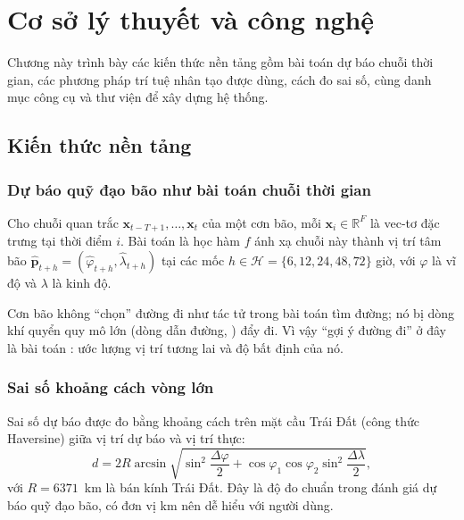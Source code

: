 \chapter{Cơ sở lý thuyết và công nghệ}
\label{ch:coso}

\begin{muctieu}
Chương này trình bày các kiến thức nền tảng gồm bài toán dự báo chuỗi thời
gian, các phương pháp trí tuệ nhân tạo được dùng, cách đo sai số, cùng danh
mục công cụ và thư viện để xây dựng hệ thống.
\end{muctieu}

\section{Kiến thức nền tảng}

\subsection{Dự báo quỹ đạo bão như bài toán chuỗi thời gian}

\begin{dinhnghia}
Cho chuỗi quan trắc $\mathbf{x}_{t-T+1}, \dots, \mathbf{x}_t$ của một cơn bão,
mỗi $\mathbf{x}_i \in \mathbb{R}^F$ là vec-tơ đặc trưng tại thời điểm $i$.
Bài toán là học hàm $f$ ánh xạ chuỗi này thành vị trí tâm bão
$\hat{\mathbf{p}}_{t+h} = (\hat\varphi_{t+h}, \hat\lambda_{t+h})$ tại các mốc
$h \in \mathcal{H} = \{6, 12, 24, 48, 72\}$ giờ, với $\varphi$ là vĩ độ và
$\lambda$ là kinh độ.
\end{dinhnghia}

Cơn bão không ``chọn'' đường đi như tác tử trong bài toán tìm đường; nó bị
dòng khí quyển quy mô lớn (dòng dẫn đường, ) đẩy đi. Vì vậy
``gợi ý đường đi'' ở đây là bài toán : ước lượng vị
trí tương lai và độ bất định của nó.

\subsection{Sai số khoảng cách vòng lớn}

Sai số dự báo được đo bằng khoảng cách trên mặt cầu Trái Đất (công thức
Haversine) giữa vị trí dự báo và vị trí thực:
\begin{equation}
d = 2R \arcsin\sqrt{\sin^2\frac{\Delta\varphi}{2}
    + \cos\varphi_1\cos\varphi_2\sin^2\frac{\Delta\lambda}{2}},
\label{eq:haversine}
\end{equation}
với $R = 6371$~km là bán kính Trái Đất. Đây là độ đo chuẩn trong đánh giá dự
báo quỹ đạo bão, có đơn vị km nên dễ hiểu với người dùng.

